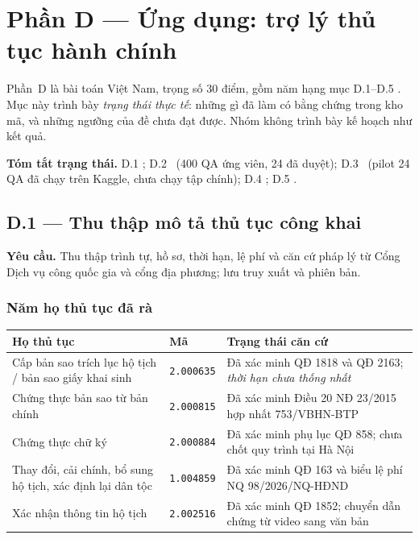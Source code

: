 \section{Phần D --- Ứng dụng: trợ lý thủ tục hành chính}
\label{sec:phan-d}

Phần~D là bài toán Việt Nam, trọng số 30 điểm, gồm năm hạng mục D.1--D.5
\cite[tr.~19]{de}. Mục này trình bày \emph{trạng thái thực tế}: những gì đã làm có
bằng chứng trong kho mã, và những ngưỡng của đề chưa đạt được. Nhóm không trình
bày kế hoạch như kết quả.

\textbf{Tóm tắt trạng thái.} D.1 \motphan; D.2 \motphan\ (400 QA ứng viên, 24 đã
duyệt); D.3 \motphan\ (pilot 24 QA đã chạy trên Kaggle, chưa chạy tập chính);
D.4 \chualam; D.5 \chualam.

\subsection{D.1 --- Thu thập mô tả thủ tục công khai}
\label{sec:d1}

\textbf{Yêu cầu.} Thu thập trình tự, hồ sơ, thời hạn, lệ phí và căn cứ pháp lý từ
Cổng Dịch vụ công quốc gia và cổng địa phương; lưu truy xuất và phiên bản.

\subsubsection{Năm họ thủ tục đã rà \motphan}

\begin{center}
\small
\begin{tabular}{p{}lp{}}
\toprule
\textbf{Họ thủ tục} & \textbf{Mã} & \textbf{Trạng thái căn cứ}\\
\midrule
Cấp bản sao trích lục hộ tịch / bản sao giấy khai sinh & \texttt{2.000635} &
Đã xác minh QĐ 1818 và QĐ 2163; \emph{thời hạn chưa thống nhất}\\
Chứng thực bản sao từ bản chính & \texttt{2.000815} &
Đã xác minh Điều 20 NĐ 23/2015 hợp nhất 753/VBHN-BTP\\
Chứng thực chữ ký & \texttt{2.000884} &
Đã xác minh phụ lục QĐ 858; chưa chốt quy trình tại Hà Nội\\
Thay đổi, cải chính, bổ sung hộ tịch, xác định lại dân tộc & \texttt{1.004859} &
Đã xác minh QĐ 163 và biểu lệ phí NQ 98/2026/NQ-HĐND\\
Xác nhận thông tin hộ tịch & \texttt{2.002516} &
Đã xác minh QĐ 1852; chuyển dẫn chứng từ video sang văn bản\\
\bottomrule
\end{tabular}
\end{center}

